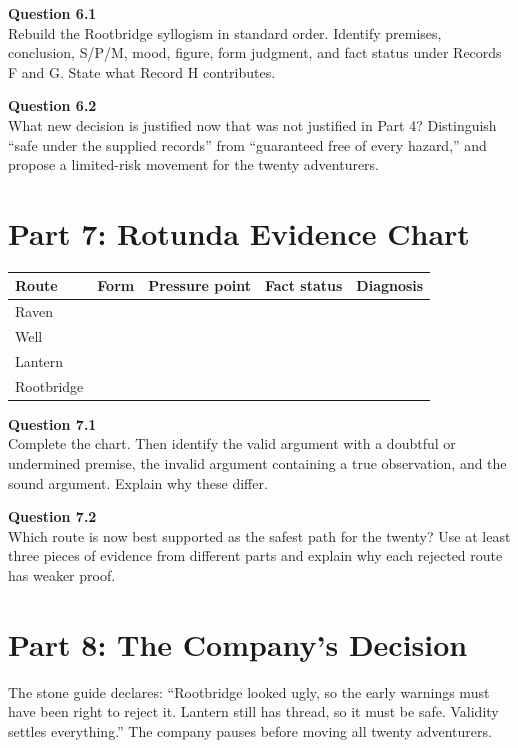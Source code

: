 \documentclass[12pt]{article}
\begin{document}
\textbf{Question 6.1}\\[-0.15em]
Rebuild the Rootbridge syllogism in standard order. Identify premises, conclusion, S/P/M, mood, figure, form judgment, and fact status under Records F and G. State what Record H contributes.

\textbf{Question 6.2}\\[-0.15em]
What new decision is justified now that was not justified in Part 4? Distinguish ``safe under the supplied records'' from ``guaranteed free of every hazard,'' and propose a limited-risk movement for the twenty adventurers.

\newpage
\section*{Part 7: Rotunda Evidence Chart}
\renewcommand{\arraystretch}{1.25}
\begin{tabular}{|p{}|p{}|p{}|p{}|p{}|}
\hline
\textbf{Route} & \textbf{Form} & \textbf{Pressure point} & \textbf{Fact status} & \textbf{Diagnosis}\\ \hline
Raven & & & & \\[0.38in] \hline
Well & & & & \\[0.38in] \hline
Lantern & & & & \\[0.38in] \hline
Rootbridge & & & & \\[0.38in] \hline
\end{tabular}

\textbf{Question 7.1}\\[-0.15em]
Complete the chart. Then identify the valid argument with a doubtful or undermined premise, the invalid argument containing a true observation, and the sound argument. Explain why these differ.

\textbf{Question 7.2}\\[-0.15em]
Which route is now best supported as the safest path for the twenty? Use at least three pieces of evidence from different parts and explain why each rejected route has weaker proof.

\newpage
\section*{Part 8: The Company's Decision}
The stone guide declares: ``Rootbridge looked ugly, so the early warnings must have been right to reject it. Lantern still has thread, so it must be safe. Validity settles everything.'' The company pauses before moving all twenty adventurers.
\end{document}
